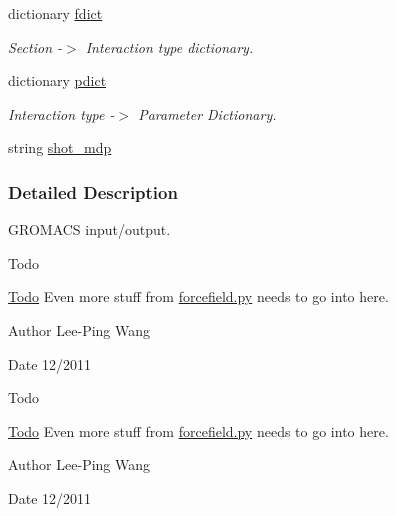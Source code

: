 \begin{DoxyCompactItemize}
dictionary \hyperlink{namespaceforcebalance_1_1gmxio_ac4e46dd6adabe0dfdeddcd86e772ad33}{fdict}
\begin{DoxyCompactList}\small\item\em \-Section -\/$>$ \-Interaction type dictionary. \end{DoxyCompactList}\item 
dictionary \hyperlink{namespaceforcebalance_1_1gmxio_afa3ee5e262ff005d87d20b4ec1581bad}{pdict}
\begin{DoxyCompactList}\small\item\em \-Interaction type -\/$>$ \-Parameter \-Dictionary. \end{DoxyCompactList}\item 
string \hyperlink{namespaceforcebalance_1_1gmxio_a4e18800d0bf6e9be6d3295338d48930d}{shot\-\_\-mdp}
\end{DoxyCompactItemize}


\subsubsection{\-Detailed \-Description}
\-G\-R\-O\-M\-A\-C\-S input/output. \begin{DoxyRefDesc}{\-Todo}
\item[\hyperlink{todo__todo000009}{\-Todo}]\-Even more stuff from \hyperlink{forcefield_8py}{forcefield.\-py} needs to go into here.\end{DoxyRefDesc}


\begin{DoxyAuthor}{\-Author}
\-Lee-\/\-Ping \-Wang 
\end{DoxyAuthor}
\begin{DoxyDate}{\-Date}
12/2011
\end{DoxyDate}
\begin{DoxyRefDesc}{\-Todo}
\item[\hyperlink{todo__todo000012}{\-Todo}]\-Even more stuff from \hyperlink{forcefield_8py}{forcefield.\-py} needs to go into here.\end{DoxyRefDesc}


\begin{DoxyAuthor}{\-Author}
\-Lee-\/\-Ping \-Wang 
\end{DoxyAuthor}
\begin{DoxyDate}{\-Date}
12/2011 
\end{DoxyDate}


